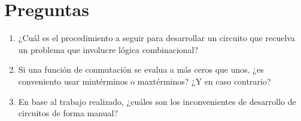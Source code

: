 \documentclass{article}
\begin{document}
    \section{Preguntas}

    \begin{enumerate}
        \item {
            ¿Cuál es el procedimiento a seguir para desarrollar un circuito que 
            recuelva un problema que involucre lógica combinacional?
        }
        \item {
            Si una función de conmutación se evalua a más ceros que unos, ¿es
            conveniento usar mintérminos o maxtérminos? ¿Y en caso contrario?
        }
        \item {
            En base al trabajo realizado, ¿cuáles son los inconvenientes de 
            desarrollo de circuitos de forma manual?
        }
    \end{enumerate}
\end{document}

